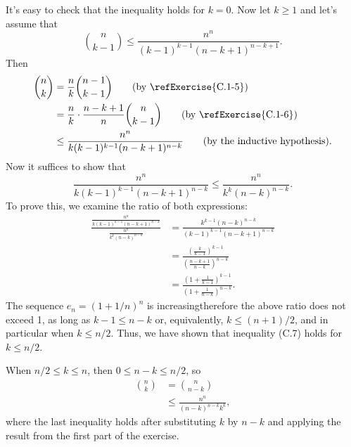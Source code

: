 It's easy to check that the inequality holds for $k=0$.
Now let $k\ge1$ and let's assume that
\[
    \binom{n}{k-1} \le \frac{n^n}{(k-1)^{k-1}(n-k+1)^{n-k+1}}.
\]
Then
\begin{align*}
    \binom{n}{k} &= \frac{n}{k}\binom{n-1}{k-1} \tag{by \refExercise{C.1-5}} \\
    &= \frac{n}{k}\cdot\frac{n-k+1}{n}\binom{n}{k-1} \tag{by \refExercise{C.1-6}} \\
    &\le \frac{n^n}{k(k-1)^{k-1}(n-k+1)^{n-k}} \tag{by the inductive hypothesis}.
\end{align*}
Now it suffices to show that
\[
    \frac{n^n}{k(k-1)^{k-1}(n-k+1)^{n-k}} \le \frac{n^n}{k^k(n-k)^{n-k}}.
\]
To prove this, we examine the ratio of both expressions:
\begin{align*}
    \frac{\frac{n^n}{k(k-1)^{k-1}(n-k+1)^{n-k}}}{\frac{n^n}{k^k(n-k)^{n-k}}} &= \frac{k^{k-1}(n-k)^{n-k}}{(k-1)^{k-1}(n-k+1)^{n-k}} \\
    &= \frac{\left(\frac{k}{k-1}\right)^{k-1}}{\left(\frac{n-k+1}{n-k}\right)^{n-k}} \\
    &= \frac{\left(1+\frac{1}{k-1}\right)^{k-1}}{\left(1+\frac{1}{n-k}\right)^{n-k}}.
\end{align*}
The sequence $e_n={(1+1/n)}^n$ is increasing\dash therefore the above ratio does not exceed 1, as long as $k-1\le n-k$ or, equivalently, $k\le(n+1)/2$, and in particular when $k\le n/2$.
Thus, we have shown that inequality (C.7) holds for $k\le n/2$.

When $n/2\le k\le n$, then $0\le n-k\le n/2$, so
\begin{align*}
    \binom{n}{k} &= \binom{n}{n-k} \tag{by equation (C.3)} \\
    &\le \frac{n^n}{(n-k)^{n-k}k^k},
\end{align*}
where the last inequality holds after substituting $k$ by $n-k$ and applying the result from the first part of the exercise.
